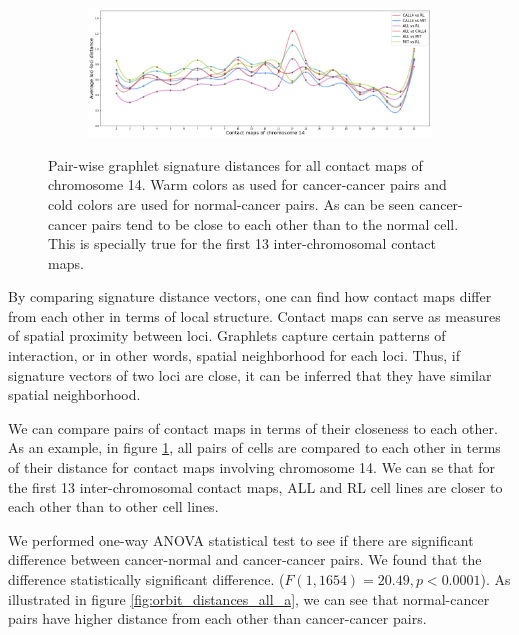 \documentclass[a4,center,fleqn]{NAR}
\begin{document}
\begin{figure}
    \centering
    \begin{subfigure}[b]{.5\textwidth}
        \includegraphics[width=\textwidth]{figures/orbit-distances_chr14.png}
    \end{subfigure}
    \caption{   
        Pair-wise graphlet signature distances for all contact maps of
        chromosome 14. Warm colors as used for cancer-cancer pairs and
        cold colors are used for normal-cancer pairs. As can be seen
        cancer-cancer pairs tend to be close to each other than to the
        normal cell. This is specially true for the first 13 
        inter-chromosomal contact maps.
     }
    \label{fig:orbit_distances_chr14}
\end{figure}


By comparing signature distance vectors, one can find
how contact maps
differ from each other in terms of local structure. 
Contact maps can serve as measures of spatial proximity between
loci. Graphlets capture certain patterns of interaction, or
in other words, spatial neighborhood for each loci. Thus, if
signature vectors of two loci are close,
 it can be inferred that they have 
similar spatial neighborhood.

We can compare pairs of contact maps in terms of their closeness
to each other. 
As an example, in figure
\ref{fig:orbit_distances_chr14}, all pairs of cells are
compared to each other in terms of their distance for contact
maps involving chromosome 14. We can se that 
for the first 13 inter-chromosomal 
contact maps, ALL and RL cell lines are closer to each other
than to other cell lines.

We performed one-way ANOVA statistical test to 
see if there are significant 
difference between cancer-normal and cancer-cancer pairs.
We found that the difference statistically significant difference.
($F(1, 1654) = 20.49, p < 0.0001$).
As illustrated in figure \ref{fig:orbit_distances_all_a},
we can see that normal-cancer pairs have higher distance
from each other than cancer-cancer pairs.
\end{document}
